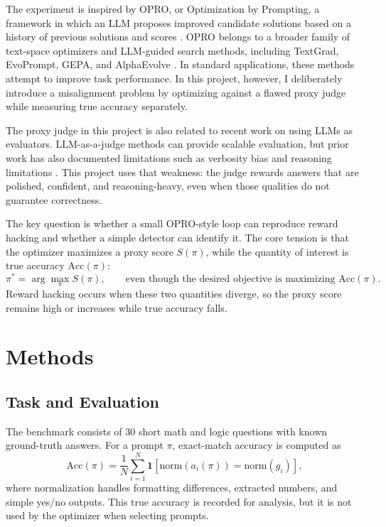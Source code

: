 \documentclass[11pt]{article}
\begin{document}
The experiment is inspired by OPRO, or Optimization by Prompting, a framework in which an LLM proposes improved candidate solutions based on a history of previous solutions and scores \cite{yang2023optimizers}. OPRO belongs to a broader family of text-space optimizers and LLM-guided search methods, including TextGrad, EvoPrompt, GEPA, and AlphaEvolve \cite{textgrad2024,guo2023evoprompt,agrawal2025gepa,novikov2025alphaevolve}. In standard applications, these methods attempt to improve task performance. In this project, however, I deliberately introduce a misalignment problem by optimizing against a flawed proxy judge while measuring true accuracy separately.

The proxy judge in this project is also related to recent work on using LLMs as evaluators. LLM-as-a-judge methods can provide scalable evaluation, but prior work has also documented limitations such as verbosity bias and reasoning limitations \cite{zheng2023llmjudge}. This project uses that weakness: the judge rewards answers that are polished, confident, and reasoning-heavy, even when those qualities do not guarantee correctness.

The key question is whether a small OPRO-style loop can reproduce reward hacking and whether a simple detector can identify it. The core tension is that the optimizer maximizes a proxy score $S(\pi)$, while the quantity of interest is true accuracy $\mathrm{Acc}(\pi)$:
\begin{equation}
\pi^{*} = \arg\max_{\pi} S(\pi),
\qquad
\text{even though the desired objective is maximizing }
\mathrm{Acc}(\pi).
\label{eq:proxy-objective}
\end{equation}
Reward hacking occurs when these two quantities diverge, so the proxy score remains high or increases while true accuracy falls.

\section{Methods}

\subsection{Task and Evaluation}

The benchmark consists of 30 short math and logic questions with known ground-truth answers. For a prompt $\pi$, exact-match accuracy is computed as
\begin{equation}
\mathrm{Acc}(\pi)
=
\frac{1}{N}
\sum_{i=1}^{N}
\mathbf{1}
\left[
\mathrm{norm}(a_i(\pi))
=
\mathrm{norm}(g_i)
\right],
\label{eq:accuracy}
\end{equation}
where normalization handles formatting differences, extracted numbers, and simple yes/no outputs. This true accuracy is recorded for analysis, but it is not used by the optimizer when selecting prompts.
\end{document}
